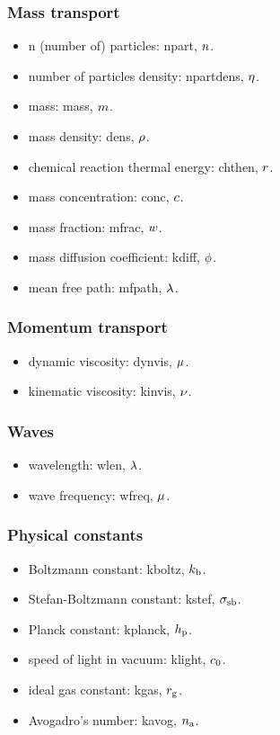 \subsubsection{Mass transport}
\begin{itemize}
\item n (number of) particles: npart, $n$.
\item number of particles density: npartdens, $\eta$.
\item mass: mass, $m$.
\item mass density: dens, $\rho$.
\item chemical reaction thermal energy: chthen, $r$.
\item mass concentration: conc, $c$.
\item mass fraction: mfrac, $w$.
\item mass diffusion coefficient: kdiff, $\phi$.
\item mean free path: mfpath, $\lambda$.
\end{itemize}

\subsubsection{Momentum transport}
\begin{itemize}
\item dynamic viscosity: dynvis, $\mu$.
\item kinematic viscosity: kinvis, $\nu$.
\end{itemize}


\subsubsection{Waves}
\begin{itemize}
\item wavelength: wlen, $\lambda$.
\item wave frequency: wfreq, $\mu$.
\end{itemize}


\subsubsection{Physical constants}
\begin{itemize}
\item Boltzmann constant: kboltz, $k_\text{b}$.
\item Stefan-Boltzmann constant: kstef, $\sigma_\text{sb}$.
\item Planck constant: kplanck, $h_\text{p}$.
\item speed of light in vacuum: klight, $c_0$.
\item ideal gas constant: kgas, $r_\text{g}$.
\item Avogadro's number: kavog, $n_\text{a}$.
\end{itemize}


